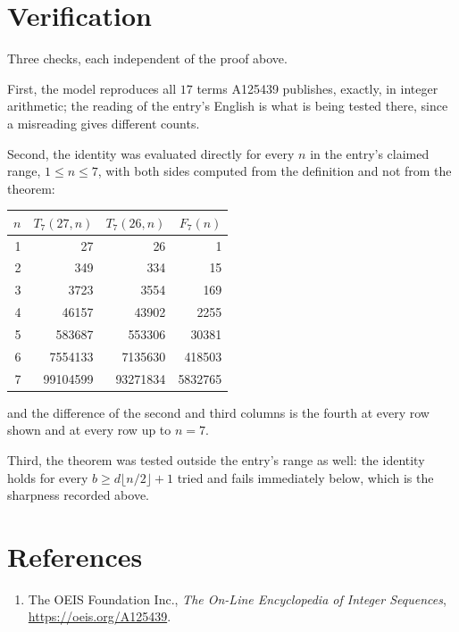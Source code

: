 \documentclass[11pt,a4paper]{article}
\theoremstyle{plain}
\theoremstyle{definition}
\begin{document}
\section{Verification}

Three checks, each independent of the proof above.

First, the model reproduces all $17$ terms A125439 publishes, exactly, in integer
arithmetic; the reading of the entry's English is what is being tested there, since a
misreading gives different counts.

Second, the identity was evaluated directly for every $n$ in the entry's claimed range,
$1\le n\le7$, with both sides computed from the definition and not from the theorem:

\begin{center}
\begin{tabular}{rrrr}
$n$ & $T_{7}(27,n)$ & $T_{7}(26,n)$ & $F_{7}(n)$ \\ \hline
1 & 27 & 26 & 1 \\
2 & 349 & 334 & 15 \\
3 & 3723 & 3554 & 169 \\
4 & 46157 & 43902 & 2255 \\
5 & 583687 & 553306 & 30381 \\
6 & 7554133 & 7135630 & 418503 \\
7 & 99104599 & 93271834 & 5832765 \\
\end{tabular}
\end{center}

\noindent and the difference of the second and third columns is the fourth at every row shown
and at every row up to $n=7$.

Third, the theorem was tested outside the entry's range as well: the identity holds for every
$b\ge d\lfloor n/2\rfloor+1$ tried and fails immediately below, which is the sharpness recorded
above.

\section*{References}
\begin{enumerate}
\item The OEIS Foundation Inc., \emph{The On-Line Encyclopedia of Integer Sequences},
\url{https://oeis.org/A125439}.
\end{enumerate}
\end{document}
